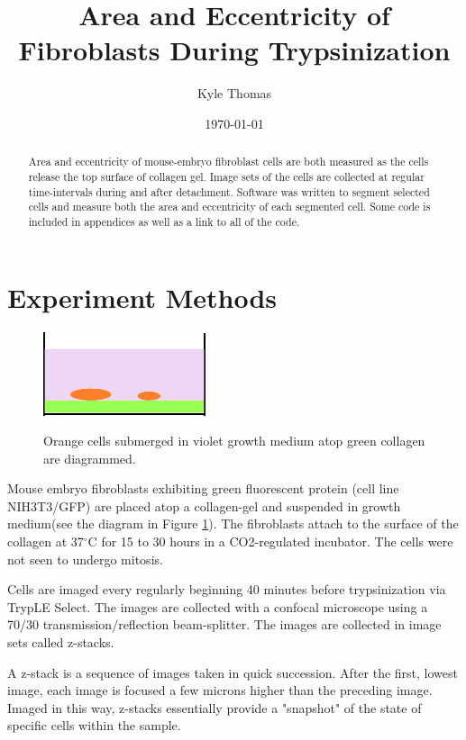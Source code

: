 \documentclass[ twocolumn,notitlepage]{ revtex4-1}
\begin{document}
\title{Area and Eccentricity of Fibroblasts During Trypsinization}\author{Kyle Thomas}\date{\today}\maketitle

\begin{abstract}
\begin{center}
Area and eccentricity of mouse-embryo fibroblast cells are both measured as the cells release the top surface of collagen gel. Image sets of the cells are collected at regular time-intervals during and after detachment. Software was written to segment selected cells and measure both the area and eccentricity of each segmented cell. Some code is included in appendices as well as a link to all of the code.
\end{center}
\end{abstract}

\section*{Experiment Methods}
\begin{figure}
  \centering
  \caption{Orange cells submerged in violet growth medium atop green collagen are diagrammed.}
  \includegraphics[clip=true,width=.4\textwidth]{img/cells-diagram}
  \label{fig:cellDiagram}
\end{figure}

Mouse embryo fibroblasts exhibiting green fluorescent protein (cell line NIH3T3/GFP) are placed atop a collagen-gel and suspended in growth medium(see the diagram in Figure \ref{fig:cellDiagram}). The fibroblasts attach to the surface of the collagen at 37$^\circ$C for 15 to 30 hours in a CO2-regulated incubator. The cells were not seen to undergo mitosis.

Cells are imaged every regularly beginning 40 minutes before trypsinization via TrypLE Select. The images are collected with a confocal microscope using a 70/30 transmission/reflection beam-splitter. The images are collected in image sets called z-stacks.

A z-stack is a sequence of images taken in quick succession. After the first, lowest image, each image is focused a few microns higher than the preceding image. Imaged in this way, z-stacks essentially provide a "snapshot" of the state of specific cells within the sample.
\end{document}
